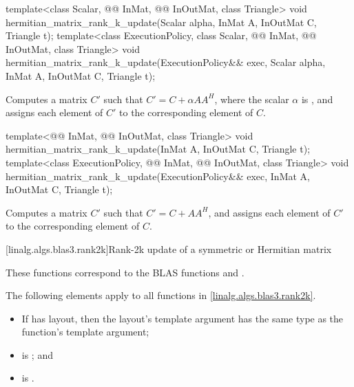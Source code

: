%
\begin{itemdecl}
template<class Scalar, @@ InMat, @@ InOutMat, class Triangle>
  void hermitian_matrix_rank_k_update(Scalar alpha, InMat A, InOutMat C, Triangle t);
template<class ExecutionPolicy,
         class Scalar, @@ InMat, @@ InOutMat, class Triangle>
  void hermitian_matrix_rank_k_update(ExecutionPolicy&& exec,
                                      Scalar alpha, InMat A, InOutMat C, Triangle t);
\end{itemdecl}

\begin{itemdescr}
\pnum
\effects
Computes a matrix $C'$ such that $C' = C + \alpha A A^H$,
where the scalar $\alpha$ is ,
and assigns each element of $C'$ to the corresponding element of $C$.
\end{itemdescr}

%
\begin{itemdecl}
template<@@ InMat, @@ InOutMat, class Triangle>
  void hermitian_matrix_rank_k_update(InMat A, InOutMat C, Triangle t);
template<class ExecutionPolicy,
         @@ InMat, @@ InOutMat, class Triangle>
  void hermitian_matrix_rank_k_update(ExecutionPolicy&& exec,
                                      InMat A, InOutMat C, Triangle t);
\end{itemdecl}

\begin{itemdescr}
\pnum
\effects
Computes a matrix $C'$ such that $C' = C + A A^H$, and
assigns each element of $C'$ to the corresponding element of $C$.
\end{itemdescr}

[linalg.algs.blas3.rank2k]{Rank-2k update of a symmetric or Hermitian matrix}

\pnum
\begin{note}
These functions correspond to the BLAS functions
 and \supercite{blas3}.
\end{note}

\pnum
The following elements apply to all functions in \ref{linalg.algs.blas3.rank2k}.

\pnum
\mandates
\begin{itemize}
\item
If  has  layout,
then the layout's  template argument has
the same type as the function's  template argument;
\item
{}
is ; and
\item
{}
is .
\end{itemize}

